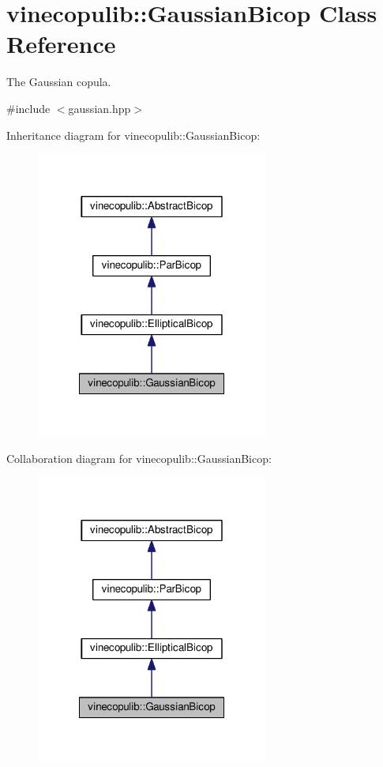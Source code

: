 \hypertarget{classvinecopulib_1_1_gaussian_bicop}{\section{vinecopulib\+:\+:Gaussian\+Bicop Class Reference}
\label{classvinecopulib_1_1_gaussian_bicop}
}


The Gaussian copula.  




{\ttfamily \#include $<$gaussian.\+hpp$>$}



Inheritance diagram for vinecopulib\+:\+:Gaussian\+Bicop\+:\nopagebreak
\begin{figure}[H]
\begin{center}
\leavevmode
\includegraphics[width=216pt]{classvinecopulib_1_1_gaussian_bicop__inherit__graph}
\end{center}
\end{figure}


Collaboration diagram for vinecopulib\+:\+:Gaussian\+Bicop\+:\nopagebreak
\begin{figure}[H]
\begin{center}
\leavevmode
\includegraphics[width=216pt]{classvinecopulib_1_1_gaussian_bicop__coll__graph}
\end{center}
\end{figure}
